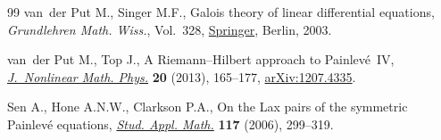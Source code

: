 \documentclass[10pt,a4paper]{amsart}
\providecommand{\LastPageEnding}{}
\numberwithin{equation}{section}
\begin{document}
\begin{thebibliography}{99}
van~der Put M., Singer M.F., Galois theory of linear differential equations,
 \textit{Grundlehren Math. Wiss.}, Vol.~328,
 \href{https://doi.org/10.1007/978-3-642-55750-7}{Springer}, Berlin, 2003.

van~der Put M., Top J., A {R}iemann--{H}ilbert approach to {P}ainlev\'e~{IV},
 \href{https://doi.org/10.1080/14029251.2013.862442}{\textit{J.~Nonlinear
 Math. Phys.}} \textbf{20} (2013), 165--177,
 \href{http://arxiv.org/abs/1207.4335}{arXiv:1207.4335}.

Sen A., Hone A.N.W., Clarkson P.A., On the {L}ax pairs of the symmetric
 {P}ainlev\'e equations,
 \href{https://doi.org/10.1111/j.1467-9590.2006.00356.x}{\textit{Stud. Appl.
 Math.}} \textbf{117} (2006), 299--319.


\end{thebibliography}\LastPageEnding
\end{document}
